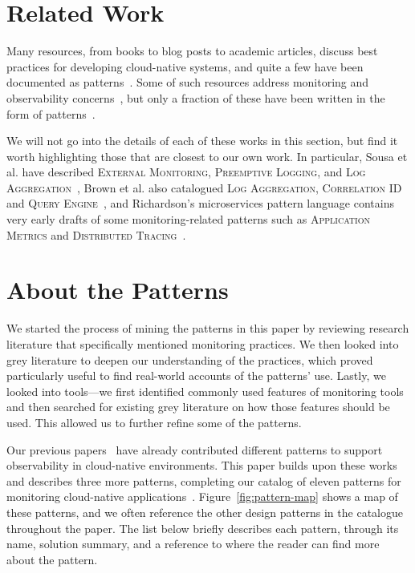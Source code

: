 \documentclass[runningheads]{llncs}
\begin{document}
\section{Related Work}\label{sec:related-work}

Many resources, from books to blog posts to academic articles, discuss best practices for developing cloud-native systems, and quite a few have been documented as patterns~\cite{Sousa-2020,Sousa2018c,Sousa2015,sousa2016engineering,Maia2022,maia2024patterns,maia2025container,Dobaj2019,cdp_aac}. Some of such resources address monitoring and observability concerns~\cite{Newman-2021,Waseem-Practices-2021,Li-2021,Darrington-2023,faseeha2025observability}, but only a fraction of these have been written in the form of patterns~\cite{Brown-2021,Richardson-Wiki-2021,Sousa2017,Sousa2018b}.

We will not go into the details of each of these works in this section, but find it worth highlighting those that are closest to our own work. In particular, Sousa et al. have described \textsc{External Monitoring}, \textsc{Preemptive Logging}, and \textsc{Log Aggregation}~\cite{Sousa2017,Sousa2018b}, Brown et al. also catalogued \textsc{Log Aggregation}, \textsc{Correlation ID} and \textsc{Query Engine}~\cite{Brown-2021}, and Richardson’s microservices pattern language contains very early drafts of some monitoring-related patterns such as \textsc{Application Metrics} and \textsc{Distributed Tracing}~\cite{Richardson-Wiki-2021}.


\section{About the Patterns}
\label{sec:about-patterns}

We started the process of mining the patterns in this paper by reviewing research literature that specifically mentioned monitoring practices. We then looked into grey literature to deepen our understanding of the practices, which proved particularly useful to find real-world accounts of the patterns' use. Lastly, we looked into tools---we first identified commonly used features of monitoring tools and then searched for existing grey literature on how those features should be used. This allowed us to further refine some of the patterns. 

Our previous papers~\cite{Albuquerque-2022,Albuquerque-2023,Albuquerque-2024} have already contributed different patterns to support observability in cloud-native environments. This paper builds upon these works and describes three more patterns, completing our catalog of eleven patterns for monitoring cloud-native applications~\cite{Albuquerque-Thesis-2022}. Figure~\ref{fig:pattern-map} shows a map of these patterns, and we often reference the other design patterns in the catalogue throughout the paper. The list below briefly describes each pattern, through its name, solution summary, and a reference to where the reader can find more about the pattern.
\end{document}
